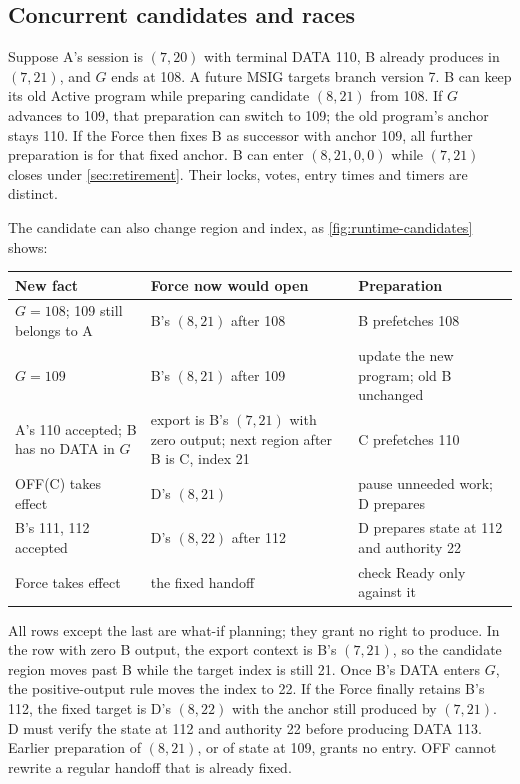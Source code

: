 \documentclass[11pt,a4paper]{article}
\begin{document}
\subsection{Concurrent candidates and races}
\label{sec:runtime-races}
Suppose A's session is $(7,20)$ with terminal DATA 110, B already produces
in $(7,21)$, and $G$ ends at 108. A future MSIG targets branch version 7.
B can keep its old Active program while preparing candidate $(8,21)$ from
108. If $G$ advances to 109, that preparation can switch to 109; the old
program's anchor stays 110. If the Force then fixes B as successor with
anchor 109, all further preparation is for that fixed anchor. B can enter
$(8,21,0,0)$ while $(7,21)$ closes under \cref{sec:retirement}. Their
locks, votes, entry times and timers are distinct.

The candidate can also change region and index, as
\cref{fig:runtime-candidates} shows:
\begin{center}\small
\begin{tabularx}{\linewidth}{@{}>{\raggedright\arraybackslash}p{.33\linewidth}>{\raggedright\arraybackslash}p{.33\linewidth}Y@{}}\toprule
New fact & Force now would open & Preparation\\\midrule
$G=108$; 109 still belongs to A & B's $(8,21)$ after 108 & B prefetches 108\\
$G=109$ & B's $(8,21)$ after 109 & update the new program; old B unchanged\\
A's 110 accepted; B has no DATA in $G$ & export is B's $(7,21)$ with zero output; next region after B is C, index 21 & C prefetches 110\\
OFF(C) takes effect & D's $(8,21)$ & pause unneeded work; D prepares\\
B's 111, 112 accepted & D's $(8,22)$ after 112 & D prepares state at 112 and authority 22\\
Force takes effect & the fixed handoff & check Ready only against it\\\bottomrule
\end{tabularx}
\end{center}
All rows except the last are what-if planning; they grant no right to
produce. In the row with zero B output, the export context is B's
$(7,21)$, so the candidate region moves past B while the target index is
still 21. Once B's DATA enters $G$, the positive-output rule moves the
index to 22. If the Force finally retains B's 112, the fixed target is D's
$(8,22)$ with the anchor still produced by $(7,21)$. D must verify the
state at 112 and authority 22 before producing DATA 113. Earlier
preparation of $(8,21)$, or of state at 109, grants no entry. OFF cannot
rewrite a regular handoff that is already fixed.
\end{document}
